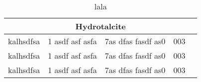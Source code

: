 \documentclass{article}
\begin{document}
 \begin{table}
\centering
\begin{tabular}{|l|c|c|c|r|}
\multicolumn{5}{c}{Hydrotalcite} \\
\hline
kalhsdfsa &	1 asdf asf asfa &7as dfas fasdf as0					&	003 & \\
kalhsdfsa &	1 asdf asf asfa &7as dfas fasdf as0					&	003  \\
kalhsdfsa &	1 asdf asf asfa &7as dfas fasdf as0					&	003 
\end{tabular}
\caption{lala}
\label{tabTableRefereaSDasdnce}
\end{table}
\end{document}
